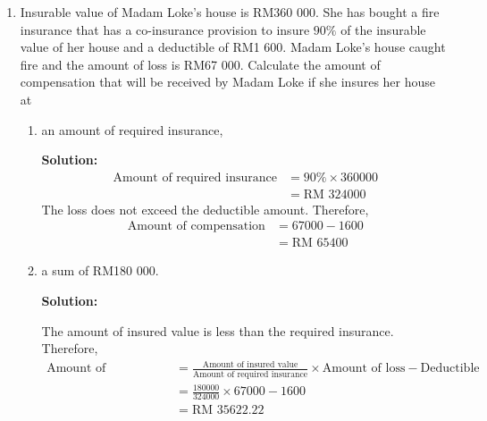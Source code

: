 \documentclass{report}
\newcommand{\sol}{

    \vspace{0.5em}\textbf{Solution:}\vspace{0.5em}}
\begin{document}
\begin{enumerate}
    \item Insurable value of Madam Loke's house is RM360 000. She has bought a fire
          insurance that has a co-insurance provision to insure $90 \%$ of the insurable
          value of her house and a deductible of RM1 600. Madam Loke's house caught fire
          and the amount of loss is RM67 000. Calculate the amount of compensation that
          will be received by Madam Loke if she insures her house at
          \begin{enumerate}
              \item an amount of required insurance, \sol{}
                    \begin{align*}
                        \text{Amount of required insurance} & = 90 \% \times 360 000 \\
                                                            & = \text{RM } 324 000
                    \end{align*}
                    The loss does not exceed the deductible amount. Therefore,
                    \begin{align*}
                        \text{Amount of compensation} & = 67 000 - 1 600    \\
                                                      & = \text{RM } 65 400
                    \end{align*}
                    \vfill\null

                    \newpage
              \item a sum of RM180 000. \sol{}

                    The amount of insured value is less than the required insurance. Therefore,
                    \begin{align*}
                        \text{Amount of compensation} & = \frac{\text{Amount of insured value}}{\text{Amount of required insurance}} \times \text{Amount of loss} - \text{Deductible} \\
                                                      & = \frac{180 000}{324 000} \times 67 000 - 1 600                                                                               \\
                                                      & = \text{RM } 35 622.22
                    \end{align*}
          \end{enumerate}


\end{enumerate}
\end{document}
